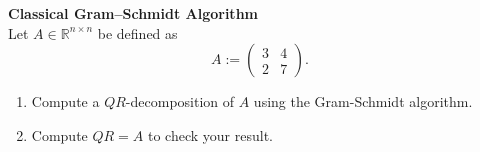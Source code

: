 \textbf{Classical Gram--Schmidt Algorithm}\\
Let $A \in \mathbb{R}^{n \times n}$ be defined as 
$$
	A := \begin{pmatrix}
		3&4\\
		2&7
	\end{pmatrix}.
$$ 
\begin{enumerate}
	\item Compute a $QR$-decomposition of $A$ using the Gram-Schmidt algorithm.
	\item Compute $QR= A$ to check your result.
\end{enumerate}